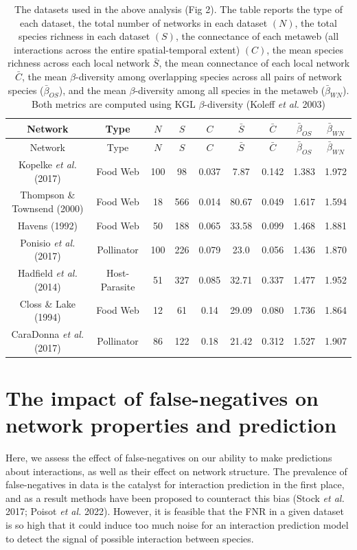 \documentclass[11pt]{article}
\begin{document}
\hypertarget{tbl:id}{}
\begin{longtable}[]{@{}ccccccccc@{}}
\caption{\label{tbl:id}The datasets used in the above analysis (Fig 2).
The table reports the type of each dataset, the total number of networks
in each dataset \((N)\), the total species richness in each dataset
\((S)\), the connectance of each metaweb (all interactions across the
entire spatial-temporal extent) \((C)\), the mean species richness
across each local network \(\bar{S}\), the mean connectance of each
local network \(\bar{C}\), the mean \(\beta\)-diversity among
overlapping species across all pairs of network species
(\(\bar{\beta}_{OS}\)), and the mean \(\beta\)-diversity among all
species in the metaweb (\(\bar{\beta}_{WN}\)). Both metrics are computed
using KGL \(\beta\)-diversity (Koleff \emph{et al.}
2003)}\tabularnewline
\toprule
Network & Type & \(N\) & \(S\) & \(C\) & \(\bar{S}\) & \(\bar{C}\) &
\(\bar{\beta}_{OS}\) & \(\bar{\beta}_{WN}\)\tabularnewline
\midrule
\endfirsthead
\toprule
Network & Type & \(N\) & \(S\) & \(C\) & \(\bar{S}\) & \(\bar{C}\) &
\(\bar{\beta}_{OS}\) & \(\bar{\beta}_{WN}\)\tabularnewline
\midrule
\endhead
Kopelke \emph{et al.} (2017) & Food Web & 100 & 98 & 0.037 & 7.87 &
0.142 & 1.383 & 1.972\tabularnewline
Thompson \& Townsend (2000) & Food Web & 18 & 566 & 0.014 & 80.67 &
0.049 & 1.617 & 1.594\tabularnewline
Havens (1992) & Food Web & 50 & 188 & 0.065 & 33.58 & 0.099 & 1.468 &
1.881\tabularnewline
Ponisio \emph{et al.} (2017) & Pollinator & 100 & 226 & 0.079 & 23.0 &
0.056 & 1.436 & 1.870\tabularnewline
Hadfield \emph{et al.} (2014) & Host-Parasite & 51 & 327 & 0.085 & 32.71
& 0.337 & 1.477 & 1.952\tabularnewline
Closs \& Lake (1994) & Food Web & 12 & 61 & 0.14 & 29.09 & 0.080 & 1.736
& 1.864\tabularnewline
CaraDonna \emph{et al.} (2017) & Pollinator & 86 & 122 & 0.18 & 21.42 &
0.312 & 1.527 & 1.907\tabularnewline
\bottomrule
\end{longtable}

\hypertarget{the-impact-of-false-negatives-on-network-properties-and-prediction}{%
\section{The impact of false-negatives on network properties and
prediction}\label{the-impact-of-false-negatives-on-network-properties-and-prediction}}

Here, we assess the effect of false-negatives on our ability to make
predictions about interactions, as well as their effect on network
structure. The prevalence of false-negatives in data is the catalyst for
interaction prediction in the first place, and as a result methods have
been proposed to counteract this bias (Stock \emph{et al.} 2017; Poisot
\emph{et al.} 2022). However, it is feasible that the FNR in a given
dataset is so high that it could induce too much noise for an
interaction prediction model to detect the signal of possible
interaction between species.
\end{document}
